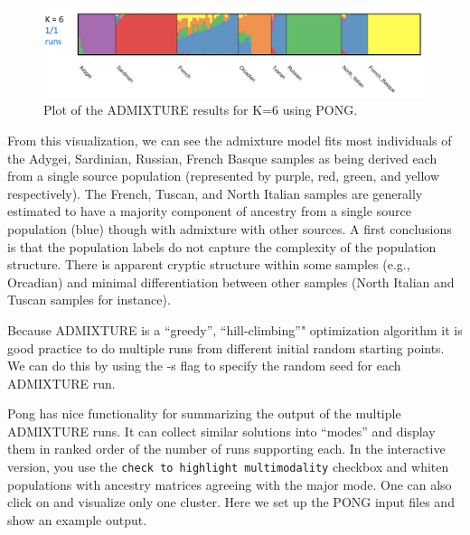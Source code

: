 \documentclass[smallextended]{svjour3}       %
\newenvironment{Shaded}{\begin{snugshade}}{\end{snugshade}}
\newcommand{\KeywordTok}[1]{\textcolor[rgb]{0.13,0.29,0.53}{\textbf{#1}}}
\newcommand{\DataTypeTok}[1]{\textcolor[rgb]{0.13,0.29,0.53}{#1}}
\newcommand{\CommentTok}[1]{\textcolor[rgb]{0.56,0.35,0.01}{\textit{#1}}}
\newcommand{\FunctionTok}[1]{\textcolor[rgb]{0.00,0.00,0.00}{#1}}
\newcommand{\VariableTok}[1]{\textcolor[rgb]{0.00,0.00,0.00}{#1}}
\newcommand{\ExtensionTok}[1]{#1}
\newcommand{\NormalTok}[1]{#1}
\begin{document}
\begin{figure}
\includegraphics[width=1\linewidth]{./plot/H938_Euro_LDprune_K6} \caption{Plot of the ADMIXTURE results for K=6 using PONG.}\label{fig:unnamed-chunk-7}
\end{figure}

From this visualization, we can see the admixture model fits most
individuals of the Adygei, Sardinian, Russian, French Basque samples as
being derived each from a single source population (represented by
purple, red, green, and yellow respectively). The French, Tuscan, and
North Italian samples are generally estimated to have a majority
component of ancestry from a single source population (blue) though with
admixture with other sources. A first conclusions is that the population
labels do not capture the complexity of the population structure. There
is apparent cryptic structure within some samples (e.g., Orcadian) and
minimal differentiation between other samples (North Italian and Tuscan
samples for instance).

Because ADMIXTURE is a ``greedy'', ``hill-climbing''" optimization
algorithm it is good practice to do multiple runs from different initial
random starting points. We can do this by using the -s flag to specify
the random seed for each ADMIXTURE run.

\begin{Shaded}
\end{Shaded}

Pong has nice functionality for summarizing the output of the multiple
ADMIXTURE runs. It can collect similar solutions into ``modes'' and
display them in ranked order of the number of runs supporting each. In
the interactive version, you use the
\texttt{check\ to\ highlight\ multimodality} checkbox and whiten
populations with ancestry matrices agreeing with the major mode. One can
also click on and visualize only one cluster. Here we set up the PONG
input files and show an example output.
\end{document}

